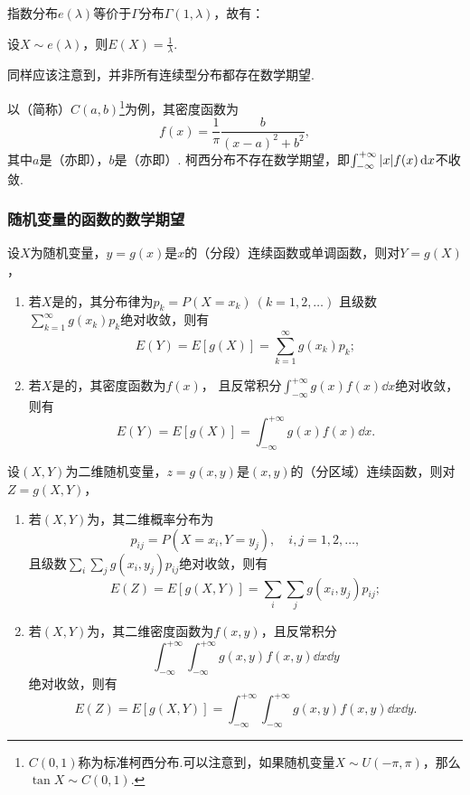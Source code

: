 指数分布\(e(\lambda)\)等价于\(\Gamma\)分布\(\Gamma(1,\lambda)\)，故有：
\begin{theorem}\label{theorem:随机变量的数字特征.指数分布的数学期望}
设\(X \sim e(\lambda)\)，则\(E(X) = \frac{1}{\lambda}\).
\end{theorem}

同样应该注意到，并非所有连续型分布都存在数学期望.

以（简称）\(C(a,b)\)\footnote{\(C(0,1)\)称为标准柯西分布.可以注意到，如果随机变量\(X \sim U(-\pi,\pi)\)，那么\(\tan X \sim C(0,1)\).}为例，其密度函数为\[
f(x) = \frac{1}{\pi} \frac{b}{(x-a)^2+b^2},
\]其中\(a\)是（亦即），\(b\)是（亦即）.
柯西分布不存在数学期望，即\(\int_{-\infty}^{+\infty} \abs{x} f(x) \dd{x}\)不收敛.

\subsubsection{随机变量的函数的数学期望}
\begin{theorem}\label{theorem:随机变量的数字特征.一维随机变量的函数的数学期望}
设\(X\)为随机变量，\(y=g(x)\)是\(x\)的（分段）连续函数或单调函数，则对\(Y=g(X)\)，
\begin{enumerate}
\item 若\(X\)是的，其分布律为\(p_k = P(X=x_k)\ (k=1,2,\dotsc)\)
且级数\(\sum\limits_{k=1}^\infty g(x_k) p_k\)绝对收敛，则有\[
E(Y) = E[g(X)] = \sum\limits_{k=1}^\infty {g(x_k) p_k};
\]
\item 若\(X\)是的，其密度函数为\(f(x)\)，
且反常积分\(\int_{-\infty}^{+\infty} g(x) f(x) \dd{x}\)绝对收敛，则有\[
E(Y) = E[g(X)] = \int_{-\infty}^{+\infty} g(x) f(x) \dd{x}.
\]
\end{enumerate}
\end{theorem}

\begin{theorem}\label{theorem:随机变量的数字特征.二维随机变量的函数的数学期望}
设\((X,Y)\)为二维随机变量，\(z=g(x,y)\)是\((x,y)\)的（分区域）连续函数，则对\(Z=g(X,Y)\)，\begin{enumerate}
\item 若\((X,Y)\)为，其二维概率分布为\[
p_{ij} = P(X=x_i,Y=y_j), \quad i,j=1,2,\dotsc,
\]且级数\(\sum\limits_i \sum\limits_j g(x_i,y_j) p_{ij}\)绝对收敛，则有\[
E(Z) = E[g(X,Y)] = \sum\limits_i \sum\limits_j g(x_i,y_j) p_{ij};
\]
\item 若\((X,Y)\)为，其二维密度函数为\(f(x,y)\)，且反常积分\[
\int_{-\infty}^{+\infty} \int_{-\infty}^{+\infty} g(x,y) f(x,y) \dd{x}\dd{y}
\]绝对收敛，则有\[
E(Z) = E[g(X,Y)] = \int_{-\infty}^{+\infty} \int_{-\infty}^{+\infty} g(x,y) f(x,y) \dd{x}\dd{y}.
\]
\end{enumerate}
\end{theorem}

